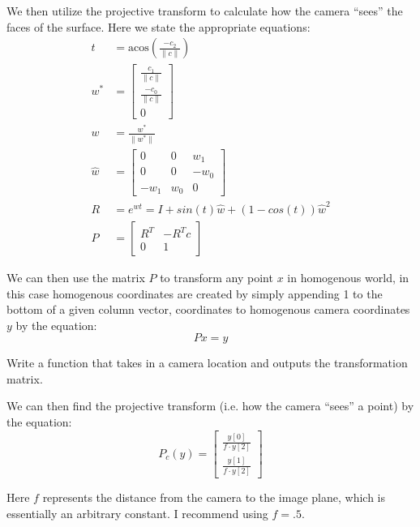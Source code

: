 We then utilize the projective transform to calculate how the camera ``sees'' the faces of the surface.
Here we state the appropriate equations:
\begin{align}
t &= \text{acos}(\frac{-c_2}{\|c\|}) \\
w^* &= \begin{bmatrix}
	\frac{c_1}{\|c\|} \\
	\frac{-c_0}{\|c\|} \\
	0
\end{bmatrix} \\
w &= \frac{w^*}{\|w^*\|} \\
\hat{w} &= \begin{bmatrix}
0 & 0 & w_1 \\
0 & 0 & -w_0 \\
-w_1 & w_0 & 0
\end{bmatrix} \\
R &= e^{\hat{w}t} = I + sin(t) \hat{w} + (1-cos(t)) \hat{w}^2 \\
P &= \begin{bmatrix}
R^T & -R^T c \\
0 & 1
\end{bmatrix}
\end{align}

We can then use the matrix $P$ to transform any point $x$ in homogenous world, in this case homogenous coordinates are created by simply appending 1 to the bottom of a given column vector, coordinates to homogenous camera coordinates $y$ by the equation:
\begin{equation*}
Px = y
\end{equation*}

\begin{problem}
Write a function that takes in a camera location and outputs the transformation matrix.
\end{problem}

We can then find the projective transform (i.e. how the camera ``sees'' a point) by the equation:
\begin{equation}
P_c(y) = \begin{bmatrix}
\frac{y[0]}{f \cdot y[2]} \\
\frac{y[1]}{f \cdot y[2]}
\end{bmatrix}
\end{equation}

Here $f$ represents the distance from the camera to the image plane, which is essentially an arbitrary constant.
I recommend using $f=.5$.

